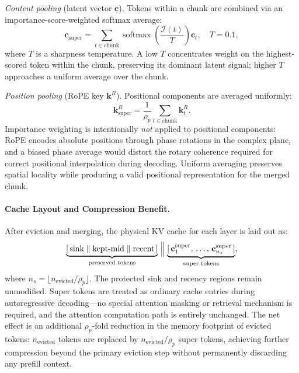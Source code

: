 \documentclass[letterpaper]{article} %
\begin{document}
\emph{Content pooling} (latent vector $\mathbf{c}$).
Tokens within a chunk are combined via an importance-score-weighted softmax
average:
\begin{equation}
  \mathbf{c}_{\mathrm{super}}
  = \sum_{t\in\mathrm{chunk}}
    \operatorname{softmax}\!\!\left(\frac{\mathcal{I}(t)}{T}\right)
    \mathbf{c}_{t},
  \quad T = 0.1,
  \label{eq:super_c}
\end{equation}
where $T$ is a sharpness temperature. A low $T$ concentrates weight on the
highest-scored token within the chunk, preserving its dominant latent signal;
higher $T$ approaches a uniform average over the chunk.

\emph{Position pooling} (RoPE key $\mathbf{k}^{R}$).
Positional components are averaged uniformly:
\begin{equation}
  \mathbf{k}^{R}_{\mathrm{super}}
  = \frac{1}{\rho_p}\sum_{t\in\mathrm{chunk}} \mathbf{k}^{R}_{t}.
  \label{eq:super_kpe}
\end{equation}
Importance weighting is intentionally \emph{not} applied to positional
components: RoPE encodes absolute positions through phase rotations in the
complex plane, and a biased phase average would distort the rotary coherence
required for correct positional interpolation during decoding. Uniform averaging
preserves spatial locality while producing a valid positional representation
for the merged chunk.

\paragraph{Cache Layout and Compression Benefit.}
After eviction and merging, the physical KV cache for each layer is laid out as:
\begin{equation}
  \underbrace{[\,\text{sink} \;\|\; \text{kept-mid} \;\|\; \text{recent}\,]}_{\text{preserved tokens}}
  \;\Bigl\|\;
  \underbrace{[\,\mathbf{c}^{\mathrm{super}}_{1},\,\ldots,\,
               \mathbf{c}^{\mathrm{super}}_{n_s}\,]}_{\text{super tokens}},
  \label{eq:cache_layout}
\end{equation}
where $n_s = \lfloor n_{\mathrm{evicted}}/\rho_p \rfloor$.
The protected sink and recency regions remain unmodified.
Super tokens are treated as ordinary cache entries during autoregressive
decoding---no special attention masking or retrieval mechanism is required,
and the attention computation path is entirely unchanged.
The net effect is an additional $\rho_p$-fold reduction in the memory
footprint of evicted tokens:
$n_{\mathrm{evicted}}$ tokens are replaced by $n_{\mathrm{evicted}}/\rho_p$
super tokens, achieving further compression beyond the primary eviction step
without permanently discarding any prefill context.
\end{document}
